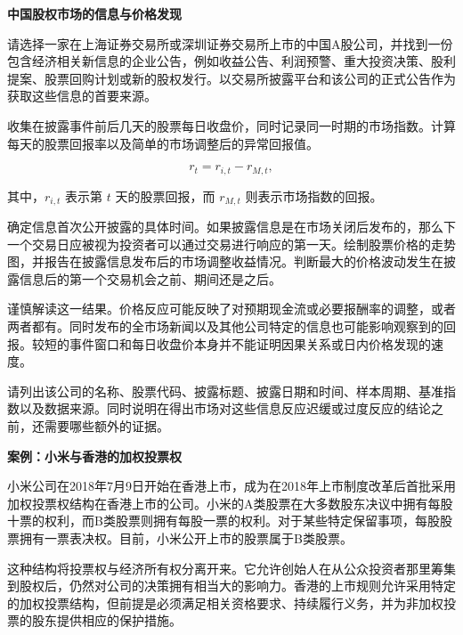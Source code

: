 

\textbf{中国股权市场的信息与价格发现}

请选择一家在上海证券交易所或深圳证券交易所上市的中国A股公司，并找到一份包含经济相关新信息的企业公告，例如收益公告、利润预警、重大投资决策、股利提案、股票回购计划或新的股权发行。以交易所披露平台和该公司的正式公告作为获取这些信息的首要来源。

收集在披露事件前后几天的股票每日收盘价，同时记录同一时期的市场指数。计算每天的股票回报率以及简单的市场调整后的异常回报值。

\begin{equation*}
r_t=r_{i,t}-r_{M,t},
\end{equation*}

其中，\(r_{i,t}\) 表示第 \(t\) 天的股票回报，而 \(r_{M,t}\) 则表示市场指数的回报。

确定信息首次公开披露的具体时间。如果披露信息是在市场关闭后发布的，那么下一个交易日应被视为投资者可以通过交易进行响应的第一天。绘制股票价格的走势图，并报告在披露信息发布后的市场调整收益情况。判断最大的价格波动发生在披露信息后的第一个交易机会之前、期间还是之后。

谨慎解读这一结果。价格反应可能反映了对预期现金流或必要报酬率的调整，或者两者都有。同时发布的全市场新闻以及其他公司特定的信息也可能影响观察到的回报。较短的事件窗口和每日收盘价本身并不能证明因果关系或日内价格发现的速度。

请列出该公司的名称、股票代码、披露标题、披露日期和时间、样本周期、基准指数以及数据来源。同时说明在得出市场对这些信息反应迟缓或过度反应的结论之前，还需要哪些额外的证据。



\textbf{案例：小米与香港的加权投票权}

小米公司在2018年7月9日开始在香港上市，成为在2018年上市制度改革后首批采用加权投票权结构在香港上市的公司。小米的A类股票在大多数股东决议中拥有每股十票的权利，而B类股票则拥有每股一票的权利。对于某些特定保留事项，每股股票拥有一票表决权。目前，小米公开上市的股票属于B类股票。

这种结构将投票权与经济所有权分离开来。它允许创始人在从公众投资者那里筹集到股权后，仍然对公司的决策拥有相当大的影响力。香港的上市规则允许采用特定的加权投票结构，但前提是必须满足相关资格要求、持续履行义务，并为非加权投票的股东提供相应的保护措施。

